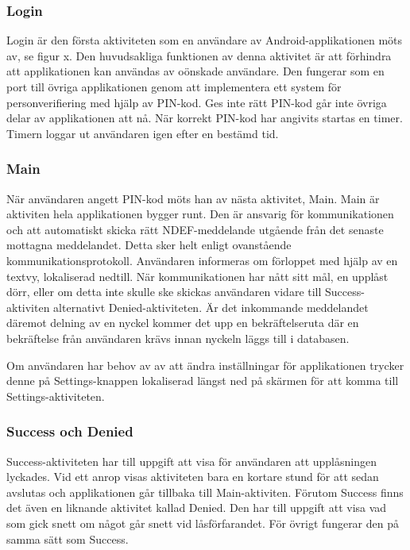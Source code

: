 \documentclass[11pt]{article}
\begin{document}
\subsubsection{Login}
Login är den första aktiviteten som en användare av Android-applikationen möts av, se figur x. Den huvudsakliga funktionen av denna aktivitet är att förhindra att applikationen kan användas av oönskade användare. Den fungerar som en port till övriga applikationen genom att implementera ett system för personverifiering med hjälp av PIN-kod. Ges inte rätt PIN-kod går inte övriga delar av applikationen att nå. När korrekt PIN-kod har angivits startas en timer. Timern loggar ut användaren igen efter en bestämd tid. 


\subsubsection{Main}
När användaren angett PIN-kod möts han av nästa aktivitet, Main. Main är aktiviten hela applikationen bygger runt. Den är ansvarig för kommunikationen och att automatiskt skicka rätt NDEF-meddelande utgående från det senaste mottagna meddelandet. Detta sker helt enligt ovanstående kommunikationsprotokoll. Användaren informeras om förloppet med hjälp av en textvy, lokaliserad nedtill. När kommunikationen har nått sitt mål, en upplåst dörr, eller om detta inte skulle ske skickas användaren vidare till Success-aktiviten alternativt Denied-aktiviteten. Är det inkommande meddelandet däremot delning av en nyckel kommer det upp en bekräftelseruta där en bekräftelse från användaren krävs innan nyckeln läggs till i databasen.

Om användaren har behov av av att ändra inställningar för applikationen trycker denne på Settings-knappen lokaliserad längst ned på skärmen för att komma till Settings-aktiviteten.

\subsubsection{Success och Denied}
Success-aktiviteten har till uppgift att visa för användaren att upplåsningen lyckades. Vid ett anrop visas aktiviteten bara en kortare stund för att sedan avslutas och applikationen går tillbaka till Main-aktiviten. Förutom Success finns det även en liknande aktivitet kallad Denied. Den har till uppgift att visa vad som gick snett om något går snett vid låsförfarandet. För övrigt fungerar den på samma sätt som Success.
\end{document}
